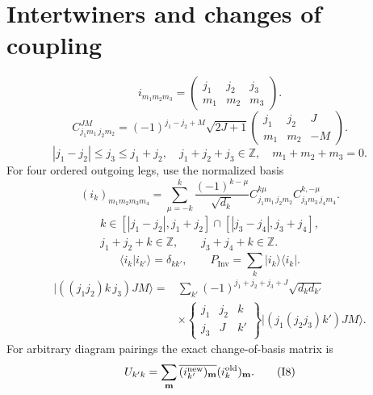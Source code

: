 \documentclass[11pt,a4paper]{article}
\newcommand{\ket}[1]{\lvert #1\rangle}
\newcommand{\bra}[1]{\langle #1\rvert}
\newcommand{\Inv}{\operatorname{Inv}}
\newcommand{\eq}[2]{\begin{equation}#2\tag{#1}\end{equation}}
\begin{document}
\section{Intertwiners and changes of coupling}
\eq{I1}{i_{m_1m_2m_3}=\begin{pmatrix}j_1&j_2&j_3\\m_1&m_2&m_3\end{pmatrix}.}
\eq{I2}{C^{JM}_{j_1m_1\,j_2m_2}=(-1)^{j_1-j_2+M}\sqrt{2J+1}\begin{pmatrix}j_1&j_2&J\\m_1&m_2&-M\end{pmatrix}.}
\eq{I3}{|j_1-j_2|\le j_3\le j_1+j_2,\quad j_1+j_2+j_3\in\mathbb Z,\quad m_1+m_2+m_3=0.}
For four ordered outgoing legs, use the normalized basis
\eq{I4}{(i_k)_{m_1m_2m_3m_4}=\sum_{\mu=-k}^k\frac{(-1)^{k-\mu}}{\sqrt{d_k}}C^{k\mu}_{j_1m_1\,j_2m_2}C^{k,-\mu}_{j_3m_3\,j_4m_4}.}
\eq{I5}{\begin{gathered}
k\in[|j_1-j_2|,j_1+j_2]\cap[|j_3-j_4|,j_3+j_4],\\
j_1+j_2+k\in\mathbb Z,\qquad j_3+j_4+k\in\mathbb Z.
\end{gathered}}
\eq{I6}{\langle i_k|i_{k'}\rangle=\delta_{kk'},\qquad P_{\Inv}=\sum_k\ket{i_k}\bra{i_k}.}
\eq{I7}{\begin{aligned}
\ket{((j_1j_2)k\,j_3)JM}={}&\sum_{k'}(-1)^{j_1+j_2+j_3+J}\sqrt{d_kd_{k'}}\\
&\times\begin{Bmatrix}j_1&j_2&k\\j_3&J&k'\end{Bmatrix}\ket{(j_1(j_2j_3)k')JM}.
\end{aligned}}
For arbitrary diagram pairings the exact change-of-basis matrix is
\eq{I8}{U_{k'k}=\sum_{\mathbf m}\overline{(i^{\rm new}_{k'})_{\mathbf m}}(i^{\rm old}_{k})_{\mathbf m}.}
\end{document}
